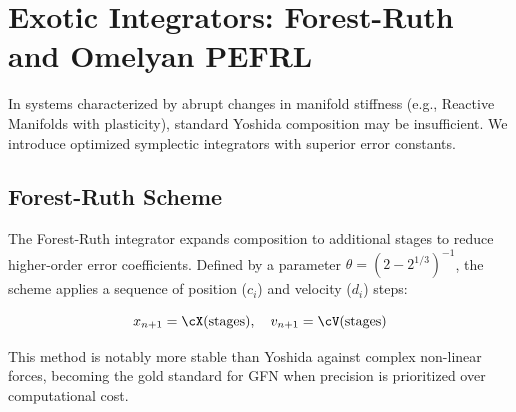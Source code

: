\documentclass[12pt,a4paper]{article}
\begin{document}
\section{Exotic Integrators: Forest-Ruth and Omelyan PEFRL}

In systems characterized by abrupt changes in manifold stiffness (e.g., Reactive Manifolds with plasticity), standard Yoshida composition may be insufficient. We introduce optimized symplectic integrators with superior error constants.

\subsection{Forest-Ruth Scheme}

The Forest-Ruth integrator expands composition to additional stages to reduce higher-order error coefficients. Defined by a parameter $\theta = (2 - 2^{1/3})^{-1}$, the scheme applies a sequence of position ($c_i$) and velocity ($d_i$) steps:

\begin{equation}
x_{n+1} = \cX(\text{stages}), \quad v_{n+1} = \cV(\text{stages})
\end{equation}

This method is notably more stable than Yoshida against complex non-linear forces, becoming the gold standard for GFN when precision is prioritized over computational cost.
\end{document}
